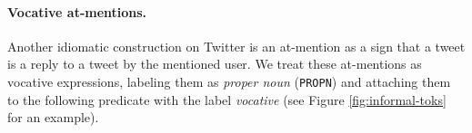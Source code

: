 \documentclass[11pt,a4paper]{article}
\newcommand{\yjcomment}[1]{\textcolor{orange}{[$_\mathrm{L}^\mathrm{Y}$#1]}}
\newcommand{\nascomment}[1]{\textcolor{blue}{[#1 ---\textsc{nas}]}}
\begin{document}

\paragraph{Vocative at-mentions.}  Another idiomatic construction on
Twitter is an at-mention %
as a sign that a tweet is a reply to a tweet by the mentioned user.  We
treat these at-mentions as vocative expressions, labeling them as
\emph{proper noun} (\texttt{PROPN}) and attaching them to the
following predicate with the label \emph{vocative} (see Figure \ref{fig:informal-toks} for an example).  

\end{document}
